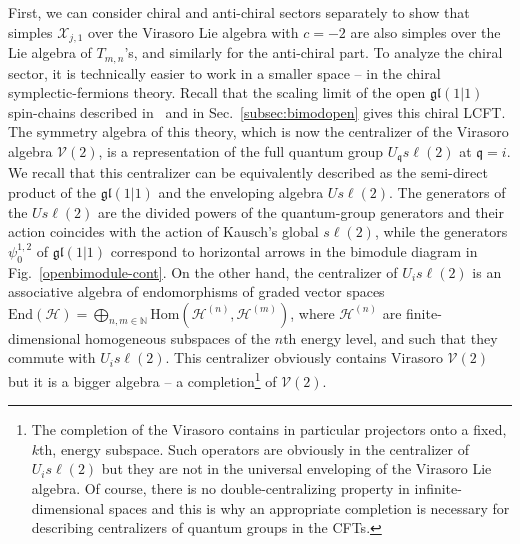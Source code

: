 \documentclass[11pt]{article}
\newcommand{\strt}{T}
\newcommand{\bstrt}{\bar{\strt}}
\newcommand{\q}{\mathfrak{q}}
\newcommand{\LQG}{U_{\q} s\ell(2)}
\newcommand{\LQGi}{U_{i} s\ell(2)}
\newcommand{\Hilb}{\mathcal{H}}
\newcommand{\oN}{\mathbb{N}}
\newcommand{\Endo}{\mathrm{End}}
\newcommand{\Hom}{\mathrm{Hom}}
\newcommand{\Vir}{\mathcal{V}}
\newcommand{\gl}{\mathfrak{gl}}
\newcommand{\VX}{\mathcal{X}}
\theoremstyle{definition}
\begin{document}
First, we can consider chiral and anti-chiral sectors separately to show
that simples $\VX_{j,1}$ over the Virasoro Lie algebra with $c=-2$ are also simples over the Lie algebra of $\strt_{m,n}$'s, and similarly for the anti-chiral part. To analyze the chiral sector, it is technically easier to work in a smaller space -- in the chiral symplectic-fermions theory. Recall
that the scaling limit of the open $\gl(1|1)$ spin-chains described in~\cite{ReadSaleur07-2} and in Sec.~\ref{subsec:bimodopen} gives this chiral  LCFT. The symmetry algebra of this theory, which is now the centralizer of the Virasoro algebra $\Vir(2)$, is a representation of the full quantum group
 $\LQG$ at $\q=i$. We recall that this centralizer can be equivalently described as the semi-direct product of the $\gl(1|1)$ and
 the enveloping algebra $U s\ell(2)$. The generators of the $U s\ell(2)$ are the divided powers of the quantum-group generators and their action coincides with the  action of Kausch's global $s\ell(2)$,  while the generators $\psi^{1,2}_0$ of $\gl(1|1)$ correspond to horizontal arrows in the bimodule diagram in Fig.~\ref{openbimodule-cont}.
  On the other hand, the centralizer of $\LQGi$ is an associative algebra of endomorphisms of graded vector spaces $\Endo(\Hilb)=\bigoplus_{n,m\in\oN}\Hom(\Hilb^{(n)},\Hilb^{(m)})$, where $\Hilb^{(n)}$ are finite-dimensional homogeneous subspaces of the $n$th energy level, and such that they commute with $\LQGi$. This centralizer obviously contains  Virasoro $\Vir(2)$ but it is a bigger algebra -- a completion\footnote{The completion of the Virasoro contains in particular
  projectors onto a fixed, $k$th, energy subspace. Such operators are obviously in the centralizer of $\LQGi$ but they are not in the universal enveloping of the Virasoro Lie algebra.  Of course, there is no double-centralizing property in infinite-dimensional spaces and this is why an appropriate completion is necessary for describing centralizers of  quantum groups in the CFTs.}
of $\Vir(2)$.
\end{document}
